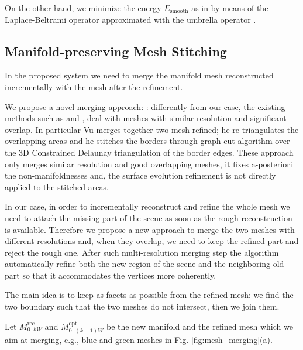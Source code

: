 On the other hand, we minimize the energy $E_{\textrm{smooth}}$ as in \cite{vu_et_al_2012} by means of the Laplace-Beltrami operator approximated with the umbrella operator \cite{wardetzky2007discrete}.



\subsection{Manifold-preserving Mesh Stitching}
\label{sec:Mesh_merging}
In the proposed system we need to merge the manifold mesh reconstructed incrementally with the mesh after the refinement.

We propose a novel merging approach: : differently from our case, the existing methods such as \cite{turk1994zippered} and \cite{VuPhD011},  deal with meshes with similar resolution and significant overlap. 
In particular  Vu  \cite{VuPhD011} merges together two mesh refined; he re-triangulates the overlapping areas and he stitches the borders through graph cut-algorithm over the 3D Constrained Delaunay triangulation of the border edges.
These approach only merges similar resolution and good overlapping meshes, it fixes a-posteriori the non-manifoldnesses and, the surface evolution refinement is not directly applied to the stitched areas.


In our case, in order to incrementally reconstruct and refine the whole mesh we need to attach the missing part of the scene as soon as the rough reconstruction is available. Therefore we propose a new approach to merge the two meshes with  different resolutions and, when they overlap, we need to keep the refined part and reject the rough one.
After such multi-resolution merging step the algorithm automatically refine both the new region of the scene and the neighboring old part so that it accommodates the vertices more coherently.


The main idea is to keep as facets as possible from the refined mesh: we find the two boundary such that the two meshes do not intersect, then we join them.

Let $\mathit{M}_{0..kW}^{\text{rec}}$ and  $\mathit{M}_{0..(k-1)W}^{\text{opt}}$ be the new manifold and the refined mesh which we aim at merging, e.g., blue and green meshes in Fig. \ref{fig:mesh_merging}(a).


